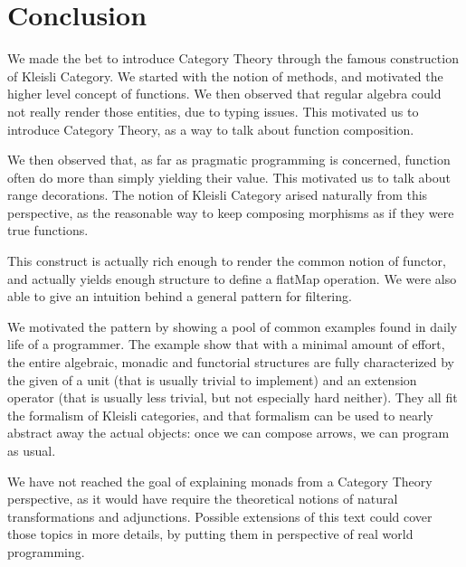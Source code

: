 \documentclass[12pt,a4paper]{report}
\theoremstyle{theorem}
\theoremstyle{definition}
\begin{document}
\chapter{Conclusion}

We made the bet to introduce Category Theory through
the famous construction of Kleisli Category.
We started with the notion of methods, and motivated
the higher level concept of functions. We then observed that regular
algebra could not really render those entities, due to
typing issues. This motivated us to introduce Category Theory,
as a way to talk about function composition.

We then observed that, as far as pragmatic programming is concerned,
function often do more than simply yielding their value.
This motivated us to talk about range decorations. The notion of Kleisli
Category arised naturally from this perspective,
as the reasonable way to keep composing morphisms as if they were
true functions.

This construct is actually rich enough
to render the common notion of functor, and actually yields enough
structure to define a flatMap operation. We were also able to give an
intuition behind a general pattern for filtering.

We motivated the pattern by showing a pool of common examples found
in daily life of a programmer. The example show that with a minimal
amount of effort, the entire algebraic, monadic and functorial
structures are fully characterized by the given of a unit
(that is usually trivial to implement) and an extension operator
(that is usually less trivial, but not especially hard neither).
They all fit the formalism of Kleisli categories, and that formalism can
be used to nearly abstract away the actual objects: once we can compose
arrows, we can program as usual.

We have not reached the goal of explaining monads from a Category Theory
perspective, as it would have require the theoretical notions of
natural transformations and adjunctions. Possible extensions of this
text could cover those topics in more details, by putting them
in perspective of real world programming.
\end{document}
